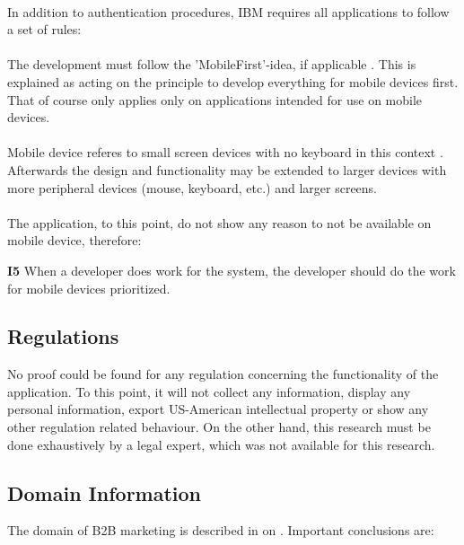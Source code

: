 \paragraph{} In addition to authentication procedures, IBM requires all applications to follow a set of rules:

\paragraph{} The development must follow the 'MobileFirst'-idea, if applicable \parencite[cf.][]{IBMCorporation.2016}. This is explained as acting on the principle to develop everything for mobile devices first. That of course only applies only on applications intended for use on mobile devices.

\paragraph{} Mobile device referes to small screen devices with no keyboard in this context \parencite[cf.][]{Duong.2014}. Afterwards the design and functionality may be extended to larger devices with more peripheral devices (mouse, keyboard, etc.) and larger screens.

\paragraph{} The application, to this point, do not show any reason to not be available on mobile device, therefore:

\begin{closeItem}
    \item [\textbf{I5}] When a developer does work for the system, the developer should do the work for mobile devices prioritized.
\end{closeItem}

\subsection{Regulations}
No proof could be found for any regulation concerning the functionality of the application. To this point, it will not collect any information, display any personal information, export US-American intellectual property or show any other regulation related behaviour. On the other hand, this research must be done exhaustively by a legal expert, which was not available for this research.

\subsection{Domain Information}
The domain of B2B marketing is described in \Cref{} on \cpagerefrange{}{}. Important conclusions are: 

